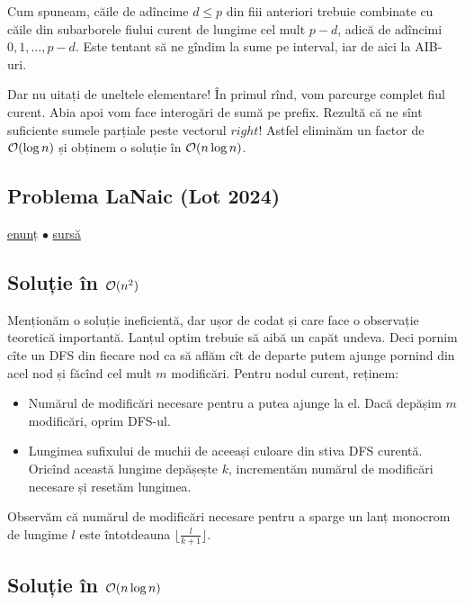 \documentclass[../main.tex]{subfiles}
\begin{document}
Cum spuneam, căile de adîncime $d \leq p$ din fiii anteriori trebuie combinate cu căile din subarborele fiului curent de lungime cel mult $p - d$, adică de adîncimi $0, 1, \dots, p - d$. Este tentant să ne gîndim la sume pe interval, iar de aici la AIB-uri.

Dar nu uitați de uneltele elementare! În primul rînd, vom parcurge complet fiul curent. Abia apoi vom face interogări de sumă pe prefix. Rezultă că ne sînt suficiente sumele parțiale peste vectorul $right$! Astfel eliminăm un factor de $\mathcal{O}(\log n)$ și obținem o soluție în $\mathcal{O}(n \log n)$.


\subsection{Problema LaNaic (Lot 2024)}
\label{problem:la-naic}

\href{https://kilonova.ro/problems/2830}{enunț}
$\bullet$
\hyperref[code:la-naic]{sursă}

\subsection*{Soluție în \texorpdfstring{$\mathcal{O}(n^2)$}{O(n2)}}

Menționăm o soluție ineficientă, dar ușor de codat și care face o observație teoretică importantă. Lanțul optim trebuie să aibă un capăt undeva. Deci pornim cîte un DFS din fiecare nod ca să aflăm cît de departe putem ajunge pornind din acel nod și făcînd cel mult $m$ modificări. Pentru nodul curent, reținem:

\begin{itemize}
  \item Numărul de modificări necesare pentru a putea ajunge la el. Dacă depășim $m$ modificări, oprim DFS-ul.
  \item Lungimea sufixului de muchii de aceeași culoare din stiva DFS curentă. Oricînd această lungime depășește $k$, incrementăm numărul de modificări necesare și resetăm lungimea.
\end{itemize}

Observăm că numărul de modificări necesare pentru a sparge un lanț monocrom de lungime $l$ este întotdeauna $\lfloor \frac{l}{k + 1} \rfloor$.

\subsection*{Soluție în \texorpdfstring{$\mathcal{O}(n \log n)$}{O(n log n)}}
\end{document}
